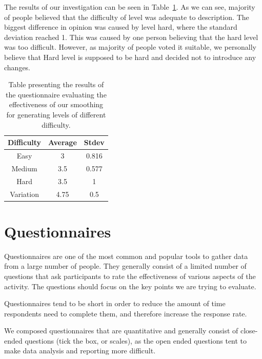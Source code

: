 The results of our investigation can be seen in Table~\ref{table:smoothing}. As we can see, majority of people believed that the difficulty of level was adequate to description. The biggest difference in opinion was caused by level hard, where the standard deviation reached 1. This was caused by one person believing that the hard level was too difficult. However, as majority of people voted it suitable, we personally believe that Hard level is supposed to be hard and decided not to introduce any changes. 

\begin{table}
\begin{center}
\begin{tabular}{| c | c | c | } 																								      \hline 
\textbf{Difficulty} & \textbf{Average} & \textbf{Stdev} \\ \hline \hline
Easy 				& 3 					   & 0.816  			   \\ \hline 
Medium 			& 3.5 			   	   & 0.577		 	   \\ \hline 
Hard					& 3.5 				   & 1  		 	  	   \\ \hline \hline
Variation			& 4.75				   & 0.5				   \\ \hline
\end{tabular}
\caption{Table presenting the results of the questionnaire evaluating the effectiveness of our smoothing for generating levels of different difficulty.}
\label{table:smoothing}
\end{center}
\end{table}


\vspace{20pt}

\section{Questionnaires}

Questionnaires are one of the most common and popular tools to gather data from a large number of people. They generally consist of a limited number of questions that ask participants to rate the effectiveness of various aspects of the activity. The questions should focus on the key points we are trying to evaluate. 

Questionnaires tend to be short in order to reduce the amount of time respondents need to complete them, and therefore increase the response rate. 

We composed questionnaires that are quantitative and generally consist of close-ended questions (tick the box, or scales), as the open ended questions tent to make data analysis and reporting more difficult.

